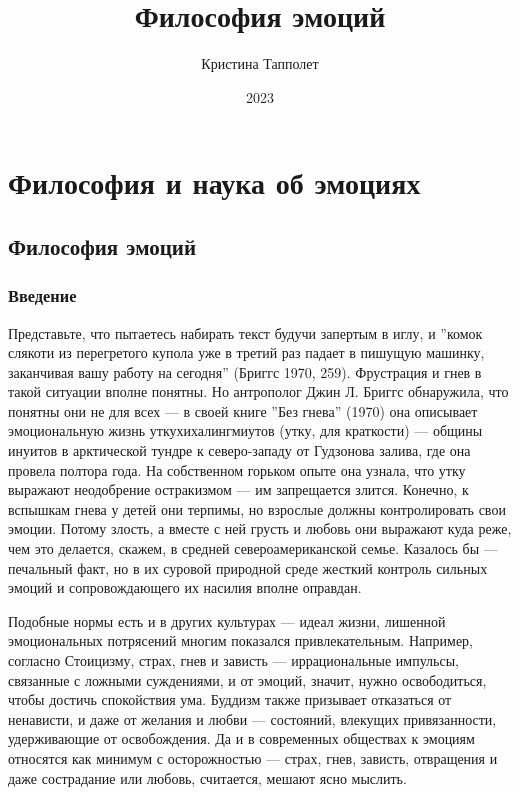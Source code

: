 \documentclass[11pt]{book}
\title{Философия эмоций}
\author{Кристина Тапполет}
\date{2023}
\begin{document}
\maketitle

\tableofcontents

\part{Философия и наука об эмоциях}

\chapter{Философия эмоций}

\section{Введение}

Представьте, что пытаетесь набирать текст будучи запертым в иглу, и ''комок слякоти из перегретого купола уже в третий раз падает в пишущую машинку, заканчивая вашу работу на сегодня'' (Бриггс 1970, 259). Фрустрация и гнев в такой ситуации вполне понятны. Но антрополог Джин Л. Бриггс обнаружила, что понятны они не для всех --- в своей книге ''Без гнева'' (1970) она описывает эмоциональную жизнь уткухихалингмиутов (утку, для краткости) --- общины инуитов в арктической тундре к северо-западу от Гудзонова залива, где она провела полтора года. На собственном горьком опыте она узнала, что утку выражают неодобрение остракизмом --- им запрещается злится. Конечно, к вспышкам гнева у детей они терпимы, но взрослые должны контролировать свои эмоции. Потому злость, а вместе с ней грусть и любовь они выражают куда реже, чем это делается, скажем, в средней североамериканской семье. Казалось бы --- печальный факт, но в их суровой природной среде жесткий контроль сильных эмоций и сопровождающего их насилия вполне оправдан.

Подобные нормы есть и в других культурах --- идеал жизни, лишенной эмоциональных потрясений многим показался привлекательным. Например, согласно Стоицизму, страх, гнев и зависть --- иррациональные импульсы, связанные с ложными суждениями, и от эмоций, значит, нужно освободиться, чтобы достичь спокойствия ума. Буддизм также призывает отказаться от ненависти, и даже от желания и любви --- состояний, влекущих привязанности, удерживающие от освобождения. Да и в современных обществах к эмоциям относятся как минимум с осторожностью --- страх, гнев, зависть, отвращения и даже сострадание или любовь, считается, мешают ясно мыслить.
\end{document}
